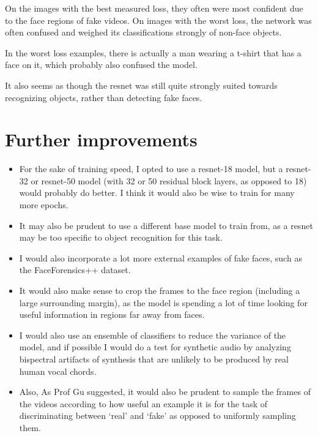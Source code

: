 \documentclass[12pt,letterpaper]{hmcpset}
\begin{document}
On the images with the best measured loss, they often were most confident due to the face regions of fake videos. On images with the worst loss, the network was often confused and weighed its classifications strongly of non-face objects.

In the worst loss examples, there is actually a man wearing a t-shirt that has a face on it, which probably also confused the model.

It also seems as though the resnet was still quite strongly suited towards recognizing objects, rather than detecting fake faces.

\section{Further improvements}
\begin{itemize}
    \item For the sake of training speed, I opted to use a resnet-18 model, but a resnet-32 or resnet-50 model (with 32 or 50 residual block layers, as opposed to 18) would probably do better. 
I think it would also be wise to train for many more epochs.

    \item It may also be prudent to use a different base model to train from, as a resnet may be too specific to object recognition for this task.

    \item I would also incorporate a lot more external examples of fake faces, such as the FaceForensics++ dataset.

    \item It would also make sense to crop the frames to the face region (including a large surrounding margin), as the model is spending a lot of time looking for useful information in regions far away from faces.

    \item I would also use an ensemble of classifiers to reduce the variance of the model, and if possible I would do a test for synthetic audio by analyzing bispectral artifacts of synthesis that are unlikely to be produced by real human vocal chords.

    \item Also, As Prof Gu suggested, it would also be prudent to sample the frames of the videos according to how useful an example it is for the task of discriminating between `real' and `fake' as opposed to uniformly sampling them.

\end{itemize}


\end{document}
